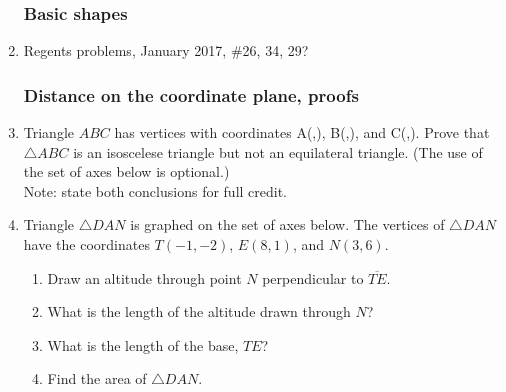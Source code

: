 \documentclass[12pt, twoside]{article}
\begin{document}
  \begin{enumerate}
    \subsubsection*{Basic shapes}
    \item Regents problems, January 2017, \#26, 34, 29?

\subsubsection*{Distance on the coordinate plane, proofs}

\item Triangle $ABC$ has vertices with coordinates A(,), B(,), and C(,). Prove that $\triangle ABC$ is an isoscelese triangle but not an equilateral triangle. (The use of the set of axes below is optional.)\\
Note: state both conclusions for full credit.

  \item Triangle $\triangle DAN$ is graphed on the set of axes below. The vertices of $\triangle DAN$ have the coordinates $T(-1,-2)$, $E(8,1)$, and $N(3,6)$.
    \begin{center} %
    \end{center}
    \begin{enumerate}
      \item Draw an altitude through point $N$ perpendicular to $\overline{TE}$.
      \item What is the length of the altitude drawn through $N$?
      \item What is the length of the base, $TE$?
      \item Find the area of  $\triangle DAN$.
    \end{enumerate}


\end{enumerate}
\end{document}
